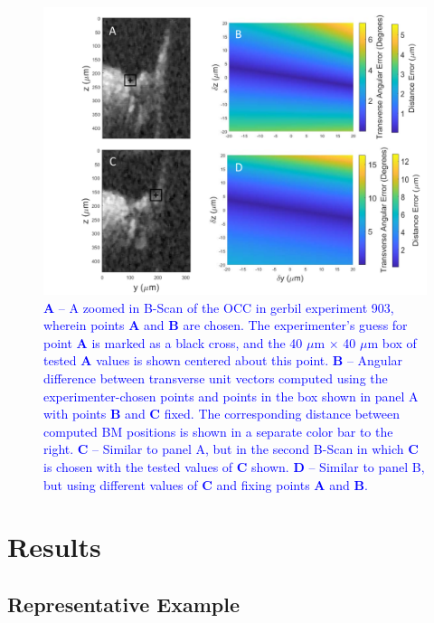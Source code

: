 \documentclass[preprint,NumberedRefs]{JASA}
\begin{document}
\begin{figure}[h!]
\centering
\includegraphics[width=\textwidth]{Figure4.pdf}
\caption{\textcolor{blue}{\textbf{A} -- A zoomed in B-Scan of the OCC in gerbil experiment 903, wherein points $\mathbf{A}$ and $\mathbf{B}$ are chosen. The experimenter's guess for point $\mathbf{A}$ is marked as a black cross, and the 40 $\mu$m $\times$ 40 $\mu$m box of tested $\mathbf{A}$ values is shown centered about this point. $\textbf{B}$ -- Angular difference between transverse unit vectors computed using the experimenter-chosen points and points in the box shown in panel A with points $\mathbf{B}$ and $\mathbf{C}$ fixed. The corresponding distance between computed BM positions is shown in a separate color bar to the right. \textbf{C} -- Similar to panel A, but in the second B-Scan in which $\mathbf{C}$ is chosen with the tested values of $\mathbf{C}$ shown. %
\textbf{D} -- Similar to panel B, but using different values of $\mathbf{C}$ and fixing points $\mathbf{A}$ and $\mathbf{B}$.}}
\label{error}
\end{figure}

\section{Results}

\subsection{Representative Example}
\end{document}
